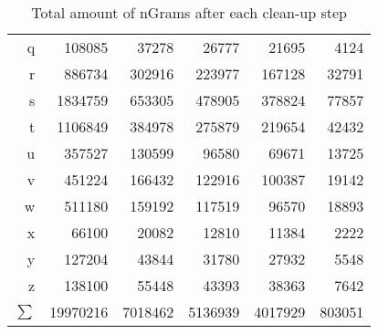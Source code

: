 \begin{table}[h]
\begin{tabular}{r r r r r r}
q & \num{108085} & \num{37278} & \num{26777} & \num{21695} & \num{4124}\\
r & \num{886734} & \num{302916} & \num{223977} & \num{167128} & \num{32791}\\
s & \num{1834759} & \num{653305} & \num{478905} & \num{378824} & \num{77857}\\
t & \num{1106849} & \num{384978} & \num{275879} & \num{219654} & \num{42432}\\
u & \num{357527} & \num{130599} & \num{96580} & \num{69671} & \num{13725}\\
v & \num{451224} & \num{166432} & \num{122916} & \num{100387} & \num{19142}\\
w & \num{511180} & \num{159192} & \num{117519} & \num{96570} & \num{18893}\\
x & \num{66100} & \num{20082} & \num{12810} & \num{11384} & \num{2222}\\
y & \num{127204} & \num{43844} & \num{31780} & \num{27932} & \num{5548}\\
z & \num{138100} & \num{55448} & \num{43393} & \num{38363} & \num{7642}\\
\midrule
$\sum$ & \num{19970216} & \num{7018462} & \num{5136939} & \num{4017929} & \num{803051}\\
\bottomrule
\end{tabular}
\caption{Total amount of nGrams after each clean-up step}
\label{tab:clean_up_numbers}
\end{table}
